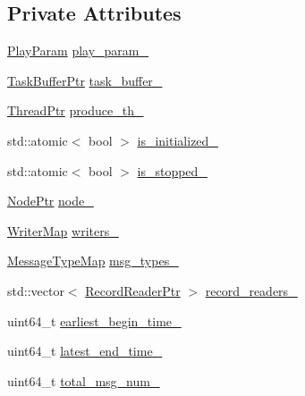 \subsection*{Private Attributes}
\begin{DoxyCompactItemize}
\item 
\hyperlink{structapollo_1_1cyber_1_1record_1_1PlayParam}{Play\-Param} \hyperlink{classapollo_1_1cyber_1_1record_1_1PlayTaskProducer_a518f01619a1c1eca007d2efaac91eb4f}{play\-\_\-param\-\_\-}
\item 
\hyperlink{classapollo_1_1cyber_1_1record_1_1PlayTaskProducer_a1a4a252c8c244a445f580a9c768c017d}{Task\-Buffer\-Ptr} \hyperlink{classapollo_1_1cyber_1_1record_1_1PlayTaskProducer_a6bc06840de3053b660c0d6a4240210bf}{task\-\_\-buffer\-\_\-}
\item 
\hyperlink{classapollo_1_1cyber_1_1record_1_1PlayTaskProducer_a55cdb4cb1be634a50c15e7c78b6b11ff}{Thread\-Ptr} \hyperlink{classapollo_1_1cyber_1_1record_1_1PlayTaskProducer_a6fd517ac3afa0c607f3edd637ed0469c}{produce\-\_\-th\-\_\-}
\item 
std\-::atomic$<$ bool $>$ \hyperlink{classapollo_1_1cyber_1_1record_1_1PlayTaskProducer_afdbb4d6483006ba644b659dda5379e80}{is\-\_\-initialized\-\_\-}
\item 
std\-::atomic$<$ bool $>$ \hyperlink{classapollo_1_1cyber_1_1record_1_1PlayTaskProducer_aa0019319f8e6fd9f729c2afbd8e0ca54}{is\-\_\-stopped\-\_\-}
\item 
\hyperlink{classapollo_1_1cyber_1_1record_1_1PlayTaskProducer_a60273f70488f8bb52d6112a32ec502bb}{Node\-Ptr} \hyperlink{classapollo_1_1cyber_1_1record_1_1PlayTaskProducer_ad28ce3bbe97649688619eb59e04184f7}{node\-\_\-}
\item 
\hyperlink{classapollo_1_1cyber_1_1record_1_1PlayTaskProducer_a044a3f88182daefbe597f7b1bbc49f5d}{Writer\-Map} \hyperlink{classapollo_1_1cyber_1_1record_1_1PlayTaskProducer_a1583c13552aa874fecf2b37961e9b82b}{writers\-\_\-}
\item 
\hyperlink{classapollo_1_1cyber_1_1record_1_1PlayTaskProducer_add93e531edd181faebfd9917c0c3930e}{Message\-Type\-Map} \hyperlink{classapollo_1_1cyber_1_1record_1_1PlayTaskProducer_a572d33ce3224a0e9c38b1dde539e3d25}{msg\-\_\-types\-\_\-}
\item 
std\-::vector$<$ \hyperlink{classapollo_1_1cyber_1_1record_1_1PlayTaskProducer_a06a6d2bd59dd7225b3ea570fcc391b14}{Record\-Reader\-Ptr} $>$ \hyperlink{classapollo_1_1cyber_1_1record_1_1PlayTaskProducer_a18151f4c9cbddab7a2e2e4087adcca56}{record\-\_\-readers\-\_\-}
\item 
uint64\-\_\-t \hyperlink{classapollo_1_1cyber_1_1record_1_1PlayTaskProducer_a3674d18b42cadfb40cd310f475ddbcda}{earliest\-\_\-begin\-\_\-time\-\_\-}
\item 
uint64\-\_\-t \hyperlink{classapollo_1_1cyber_1_1record_1_1PlayTaskProducer_abf138d5ebe68bc5deb479e9d200e8141}{latest\-\_\-end\-\_\-time\-\_\-}
\item 
uint64\-\_\-t \hyperlink{classapollo_1_1cyber_1_1record_1_1PlayTaskProducer_acb0ceee2f2602642b78806d06966698e}{total\-\_\-msg\-\_\-num\-\_\-}
\end{DoxyCompactItemize}

